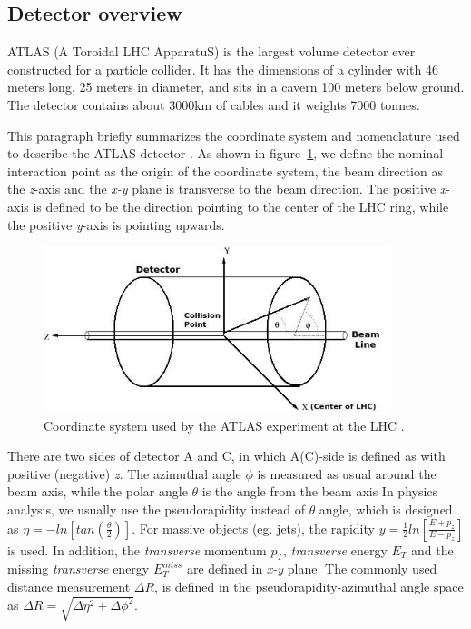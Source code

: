 \subsection{Detector overview}

ATLAS (A Toroidal LHC ApparatuS) is the largest volume detector ever constructed for a particle collider.
It has the dimensions of a cylinder with 46 meters long, 25 meters in diameter, and sits in a cavern 100 meters below ground.
The detector contains about 3000km of cables and it weights 7000 tonnes.

This paragraph briefly summarizes the coordinate system and nomenclature used to describe the ATLAS detector \cite{Collaboration_2008}.
As shown in figure~\ref{fig:coordinate}, we define the nominal interaction point as the origin of the coordinate system, the beam direction as the \textit{z}-axis and the \textit{x-y} plane is transverse to the beam direction.
The positive \textit{x}-axis is defined to be the direction pointing to the center of the LHC ring, 
while the positive \textit{y}-axis is pointing upwards.
\begin{figure}[!htb]
  \centering
  \includegraphics[width=0.9\textwidth]{figures/Detector/Coordinate_system_atlas.png}
  \caption{Coordinate system used by the ATLAS experiment at the LHC \cite{Perez:phdthesis}.}
  \label{fig:coordinate}
\end{figure}
There are two sides of detector A and C, in which A(C)-side is defined as with positive (negative) \textit{z}.
The azimuthal angle $\phi$ is measured as usual around the beam axis, while the polar angle $\theta$ is the angle from the beam axis
In physics analysis, we usually use the pseudorapidity instead of $\theta$ angle, which is designed as $\eta = - ln [tan\left( \frac{\theta}{2}\right)]$. 
For massive objects (eg. jets), the rapidity $y = \frac{1}{2} ln[ \frac{E+p_{z}}{E-p_{z}}]$ is used.
In addition, the \textit{transverse} momentum $p_{T}$, \textit{transverse} energy $E_{T}$ and the missing \textit{transverse} energy $E_{T}^{miss}$ are defined in \textit{x-y} plane.
The commonly used distance measurement $\Delta R$, is defined in the pseudorapidity-azimuthal angle space as $\Delta R = \sqrt{ \Delta\eta^{2} + \Delta\phi^{2}}$.

